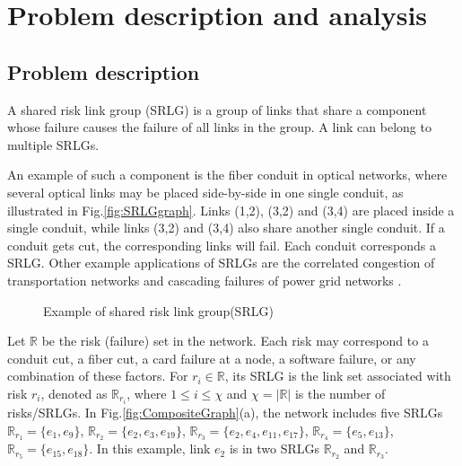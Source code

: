 \section{Problem description and analysis}
\label{sec:Problem}

\subsection{Problem description}
A shared risk link group (SRLG) is a group of links that share a component whose failure causes the failure of all links in the group. A link can belong to multiple SRLGs.

An example of such a component is the fiber conduit \cite{bhandari1994optimal} in optical networks, where several optical links may be placed side-by-side in one single conduit, as illustrated in Fig.\ref{fig:SRLGgraph}. Links (1,2), (3,2) and (3,4) are placed inside a single conduit, while links (3,2) and (3,4) also share another single conduit. If a conduit gets cut, the corresponding links will fail. Each conduit corresponds a SRLG.  Other example applications of SRLGs are the correlated congestion of transportation networks and cascading failures of power grid networks \cite{coudert2007shared}.
\begin{figure}[htbp]

  \centering
{}
\caption{Example of shared risk link group(SRLG)}\label{fig:SRLGgraph}
\label{fig:Logic shift operation}

\end{figure}

Let $\mathbb{R}$ be the risk (failure) set in the network. Each risk may correspond to a conduit cut, a fiber cut, a card failure at a node, a software failure, or any combination of these factors. For $r_i \in \mathbb{R}$, its SRLG is the link set associated with risk $r_i$, denoted as $\mathbb{R}_{r_i}$, where $1\leq i\leq \chi$ and $\chi=|{\mathbb{R}}|$ is the number of risks/SRLGs.  In Fig.\ref{fig:CompositeGraph}(a), the network includes five SRLGs $\mathbb{R}_{r_1}=\{e_1,e_9\}$, $\mathbb{R}_{r_2}=\{e_2,e_3,e_{19}\}$, $\mathbb{R}_{r_3}=\{e_2,e_4,e_{11},e_{17}\}$, $\mathbb{R}_{r_4}=\{e_5,e_{13}\}$, $\mathbb{R}_{r_5}=\{e_{15},e_{18}\}$. In this example, link $e_2$ is in two SRLGs $\mathbb{R}_{r_2}$ and $\mathbb{R}_{r_3}$.

